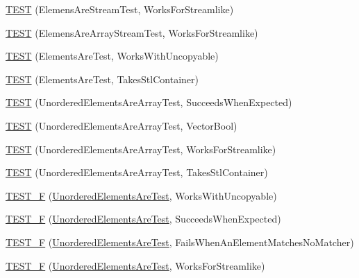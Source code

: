\begin{DoxyCompactItemize}
\hyperlink{namespacetesting_1_1gmock__matchers__test_adb0f512a2369d69f056e42e1cc5f3fc2}{T\+E\+ST} (Elemens\+Are\+Stream\+Test, Works\+For\+Streamlike)
\item 
\hyperlink{namespacetesting_1_1gmock__matchers__test_a5cc317a80c3501cb7f53d07043b7270c}{T\+E\+ST} (Elemens\+Are\+Array\+Stream\+Test, Works\+For\+Streamlike)
\item 
\hyperlink{namespacetesting_1_1gmock__matchers__test_ab403dce87c2d198a4f709d7f781d03c6}{T\+E\+ST} (Elements\+Are\+Test, Works\+With\+Uncopyable)
\item 
\hyperlink{namespacetesting_1_1gmock__matchers__test_a290280b9e89a57833c9fc706d153b98a}{T\+E\+ST} (Elements\+Are\+Test, Takes\+Stl\+Container)
\item 
\hyperlink{namespacetesting_1_1gmock__matchers__test_adb7e47654f1536fc049243f765292825}{T\+E\+ST} (Unordered\+Elements\+Are\+Array\+Test, Succeeds\+When\+Expected)
\item 
\hyperlink{namespacetesting_1_1gmock__matchers__test_a3d7df4fa0dd3e8247f4c2d4b02d801f0}{T\+E\+ST} (Unordered\+Elements\+Are\+Array\+Test, Vector\+Bool)
\item 
\hyperlink{namespacetesting_1_1gmock__matchers__test_a1ff2a93a8f031a5b23dbc699a462043b}{T\+E\+ST} (Unordered\+Elements\+Are\+Array\+Test, Works\+For\+Streamlike)
\item 
\hyperlink{namespacetesting_1_1gmock__matchers__test_aa3a960ec78e2b1e860c305f4598f39ec}{T\+E\+ST} (Unordered\+Elements\+Are\+Array\+Test, Takes\+Stl\+Container)
\item 
\hyperlink{namespacetesting_1_1gmock__matchers__test_ab09132c3b991b8f104f3091370d2fe55}{T\+E\+S\+T\+\_\+F} (\hyperlink{classtesting_1_1gmock__matchers__test_1_1_unordered_elements_are_test}{Unordered\+Elements\+Are\+Test}, Works\+With\+Uncopyable)
\item 
\hyperlink{namespacetesting_1_1gmock__matchers__test_a177c3db59da001df2441deb1ddb083af}{T\+E\+S\+T\+\_\+F} (\hyperlink{classtesting_1_1gmock__matchers__test_1_1_unordered_elements_are_test}{Unordered\+Elements\+Are\+Test}, Succeeds\+When\+Expected)
\item 
\hyperlink{namespacetesting_1_1gmock__matchers__test_a62fd481b1160a667c785e6009ff87163}{T\+E\+S\+T\+\_\+F} (\hyperlink{classtesting_1_1gmock__matchers__test_1_1_unordered_elements_are_test}{Unordered\+Elements\+Are\+Test}, Fails\+When\+An\+Element\+Matches\+No\+Matcher)
\item 
\hyperlink{namespacetesting_1_1gmock__matchers__test_a2affca2a152e4537c2f06518eaa2eac5}{T\+E\+S\+T\+\_\+F} (\hyperlink{classtesting_1_1gmock__matchers__test_1_1_unordered_elements_are_test}{Unordered\+Elements\+Are\+Test}, Works\+For\+Streamlike)

\end{DoxyCompactItemize}
